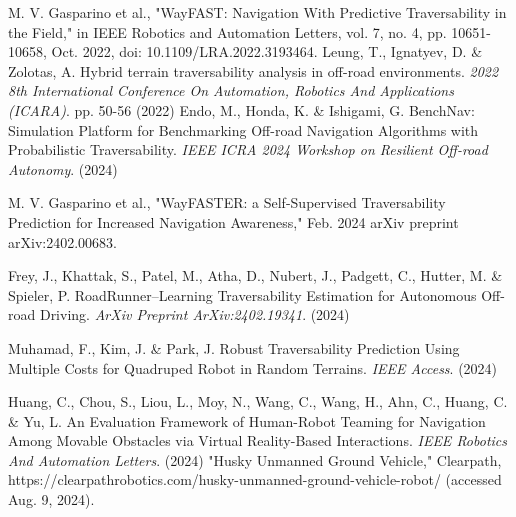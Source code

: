 \documentclass[letterpaper, 10 pt, conference]{ieeeconf}  %
\begin{document}







\begin{thebibliography}{99}

 M. V. Gasparino et al., "WayFAST: Navigation With Predictive Traversability in the Field," in IEEE Robotics and Automation Letters, vol. 7, no. 4, pp. 10651-10658, Oct. 2022, doi: 10.1109/LRA.2022.3193464.
Leung, T., Ignatyev, D. \& Zolotas, A. Hybrid terrain traversability analysis in off-road environments. {\em 2022 8th International Conference On Automation, Robotics And Applications (ICARA)}. pp. 50-56 (2022)
Endo, M., Honda, K. \& Ishigami, G. BenchNav: Simulation Platform for Benchmarking Off-road Navigation Algorithms with Probabilistic Traversability. {\em IEEE ICRA 2024 Workshop on Resilient Off-road Autonomy}. (2024)

 M. V. Gasparino et al., "WayFASTER: a Self-Supervised Traversability Prediction for Increased Navigation Awareness," Feb. 2024 arXiv preprint arXiv:2402.00683.

Frey, J., Khattak, S., Patel, M., Atha, D., Nubert, J., Padgett, C., Hutter, M. \& Spieler, P. RoadRunner–Learning Traversability Estimation for Autonomous Off-road Driving. {\em ArXiv Preprint ArXiv:2402.19341}. (2024)

Muhamad, F., Kim, J. \& Park, J. Robust Traversability Prediction Using Multiple Costs for Quadruped Robot in Random Terrains. {\em IEEE Access}. (2024)



Huang, C., Chou, S., Liou, L., Moy, N., Wang, C., Wang, H., Ahn, C., Huang, C. \& Yu, L. An Evaluation Framework of Human-Robot Teaming for Navigation Among Movable Obstacles via Virtual Reality-Based Interactions. {\em IEEE Robotics And Automation Letters}. (2024)
"Husky Unmanned Ground Vehicle," Clearpath, https://clearpathrobotics.com/husky-unmanned-ground-vehicle-robot/ (accessed Aug. 9, 2024).


\end{thebibliography}
\end{document}
